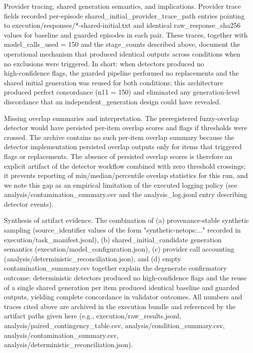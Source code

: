 \documentclass[conference]{IEEEtran}
\begin{document}
Provider tracing, shared generation semantics, and implications. Provider trace fields recorded per‑episode shared\_initial\_provider\_trace\_path entries pointing to execution/responses/*-shared-initial.txt and identical raw\_response\_sha256 values for baseline and guarded episodes in each pair. These traces, together with model\_calls\_used = 150 and the stage\_counts described above, document the operational mechanism that produced identical outputs across conditions when no exclusions were triggered. In short: when detectors produced no high‑confidence flags, the guarded pipeline performed no replacements and the shared initial generation was reused for both conditions; this architecture produced perfect concordance (n11 = 150) and eliminated any generation‑level discordance that an independent\_generation design could have revealed.

Missing overlap summaries and interpretation. The preregistered fuzzy‑overlap detector would have persisted per‑item overlap scores and flags if thresholds were crossed. The archive contains no such per‑item overlap summary because the detector implementation persisted overlap outputs only for items that triggered flags or replacements. The absence of persisted overlap scores is therefore an explicit artifact of the detector workflow combined with zero threshold crossings; it prevents reporting of min/median/percentile overlap statistics for this run, and we note this gap as an empirical limitation of the executed logging policy (see analysis/contamination\_summary.csv and the analysis\_log.jsonl entry describing detector events).

Synthesis of artifact evidence. The combination of (a) provenance‑stable synthetic sampling (source\_identifier values of the form "synthetic-netops:..." recorded in execution/task\_manifest.jsonl), (b) shared\_initial\_candidate generation semantics (execution/model\_configuration.json), (c) provider call accounting (analysis/deterministic\_reconciliation.json), and (d) empty contamination\_summary.csv together explain the degenerate confirmatory outcome: deterministic detectors produced no high‑confidence flags and the reuse of a single shared generation per item produced identical baseline and guarded outputs, yielding complete concordance in validator outcomes. All numbers and traces cited above are archived in the execution bundle and referenced by the artifact paths given here (e.g., execution/raw\_results.jsonl, analysis/paired\_contingency\_table.csv, analysis/condition\_summary.csv, analysis/contamination\_summary.csv, analysis/deterministic\_reconciliation.json).
\end{document}
